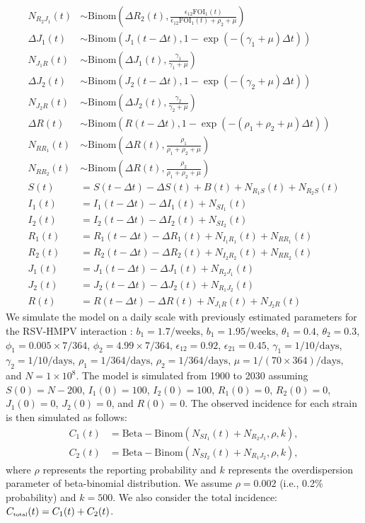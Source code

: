 \documentclass[12pt]{article}
\newcommand{\tsub}[2]{#1_{{\textrm{\tiny #2}}}}
\begin{document}
\begin{align}
N_{R_2J_1}(t) &\sim \mathrm{Binom}\left(\Delta R_2(t), \frac{\epsilon_{12} \textrm{FOI}_1(t)}{\epsilon_{12} \textrm{FOI}_1(t) + \rho_2 + \mu} \right)\\
\Delta J_1(t) &\sim \mathrm{Binom}\left(J_1(t-\Delta t), 1- \exp(-(\gamma_1 + \mu) \Delta t )\right) \\
N_{J_1R}(t) &\sim \mathrm{Binom}\left(\Delta J_1(t), \frac{\gamma_1}{\gamma_1 + \mu} \right)\\
\Delta J_2(t) &\sim \mathrm{Binom}\left(J_2(t-\Delta t), 1- \exp(-(\gamma_2 + \mu) \Delta t )\right) \\
N_{J_2R}(t) &\sim \mathrm{Binom}\left(\Delta J_2(t), \frac{\gamma_2}{\gamma_2 + \mu} \right)\\
\Delta R(t) &\sim \mathrm{Binom}\left(R(t-\Delta t), 1- \exp(-(\rho_1 + \rho_2 + \mu) \Delta t )\right) \\
N_{RR_1}(t) &\sim \mathrm{Binom}\left(\Delta R(t), \frac{\rho_1}{\rho_1 + \rho_2 + \mu} \right)\\
N_{RR_2}(t) &\sim \mathrm{Binom}\left(\Delta R(t), \frac{\rho_2}{\rho_1 + \rho_2 + \mu} \right)\\
S(t) &= S(t-\Delta t) - \Delta S(t) + B(t) + N_{R_1S}(t) + N_{R_2S}(t)\\
I_1(t) &= I_1(t-\Delta t) - \Delta I_1(t) + N_{SI_1}(t) \\
I_2(t) &= I_2(t-\Delta t) - \Delta I_2(t) + N_{SI_2}(t) \\
R_1(t) &= R_1(t-\Delta t) - \Delta R_1(t) + N_{I_1R_1}(t) + N_{RR_1}(t)\\
R_2(t) &= R_2(t-\Delta t) - \Delta R_2(t) + N_{I_2R_2}(t) + N_{RR_2}(t)\\
J_1(t) &= J_1(t-\Delta t) - \Delta J_1(t) + N_{R_2J_1}(t) \\
J_2(t) &= J_2(t-\Delta t) - \Delta J_2(t) + N_{R_1J_2}(t) \\
R(t) &= R(t-\Delta t) - \Delta R(t) + N_{J_1 R}(t) + N_{J_2 R}(t) 
\end{align}
We simulate the model on a daily scale with previously estimated parameters for the RSV-HMPV interaction \citep{bhattacharyya2015cross}:
$b_1=1.7/\mathrm{weeks}$, $b_1=1.95/\mathrm{weeks}$, $\theta_1 = 0.4$, $\theta_2 = 0.3$, $\phi_1=0.005 \times 7/364$, $\phi_2=4.99 \times 7/364$, $\epsilon_{12}=0.92$, $\epsilon_{21}=0.45$, $\gamma_1=1/10/\mathrm{days}$, $\gamma_2=1/10/\mathrm{days}$, $\rho_1=1/364/\mathrm{days}$, $\rho_2=1/364/\mathrm{days}$, $\mu=1/(70\times 364)/\mathrm{days}$, and $N = 1 \times 10^8$.
The model is simulated from 1900 to 2030 assuming $S(0) = N - 200$, $I_1(0) = 100$, $I_2(0) = 100$, $R_1(0) = 0$, $R_2(0) = 0$, $J_1(0) = 0$, $J_2(0) = 0$, and $R(0) = 0$.
The observed incidence for each strain is then simulated as follows:
\begin{align}
C_1(t) &= \mathrm{Beta-Binom}(N_{SI_1}(t) + N_{R_2J_1}, \rho, k),\\ 
C_2(t) &= \mathrm{Beta-Binom}(N_{SI_2}(t) + N_{R_1J_2}, \rho, k),
\end{align}
where $\rho$ represents the reporting probability and $k$ represents the overdispersion parameter of beta-binomial distribution.
We assume $\rho = 0.002$ (i.e., 0.2\% probability) and $k = 500$.
We also consider the total incidence: $\tsub{C}{total}(t) = C_1(t) + C_2(t)$.
\end{document}
